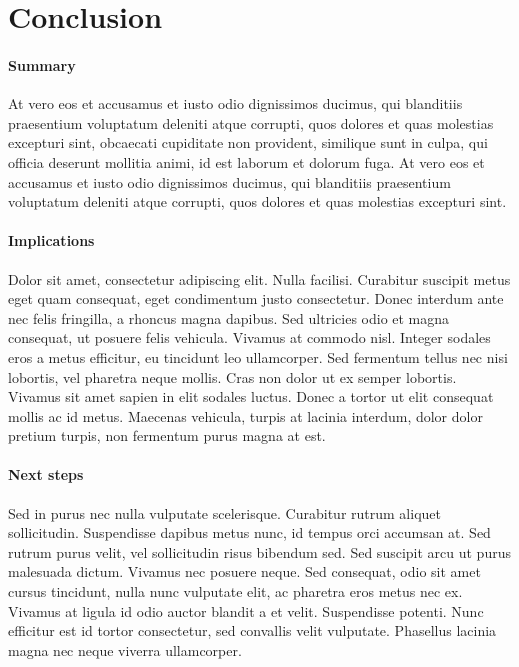 \documentclass[letterpaper,11pt,leqno]{article}
\begin{document}
\section{Conclusion}\label{s:ccl}

\paragraph{Summary}  At vero eos et accusamus et iusto odio dignissimos ducimus, qui blanditiis praesentium voluptatum deleniti atque corrupti, quos dolores et quas molestias excepturi sint, obcaecati cupiditate non provident, similique sunt in culpa, qui officia deserunt mollitia animi, id est laborum et dolorum fuga. At vero eos et accusamus et iusto odio dignissimos ducimus, qui blanditiis praesentium voluptatum deleniti atque corrupti, quos dolores et quas molestias excepturi sint.

\paragraph{Implications} Dolor sit amet, consectetur adipiscing elit. Nulla facilisi. Curabitur suscipit metus eget quam consequat, eget condimentum justo consectetur. Donec interdum ante nec felis fringilla, a rhoncus magna dapibus. Sed ultricies odio et magna consequat, ut posuere felis vehicula. Vivamus at commodo nisl. Integer sodales eros a metus efficitur, eu tincidunt leo ullamcorper. Sed fermentum tellus nec nisi lobortis, vel pharetra neque mollis. Cras non dolor ut ex semper lobortis. Vivamus sit amet sapien in elit sodales luctus. Donec a tortor ut elit consequat mollis ac id metus. Maecenas vehicula, turpis at lacinia interdum, dolor dolor pretium turpis, non fermentum purus magna at est. 

\paragraph{Next steps} Sed in purus nec nulla vulputate scelerisque. Curabitur rutrum aliquet sollicitudin. Suspendisse dapibus metus nunc, id tempus orci accumsan at. Sed rutrum purus velit, vel sollicitudin risus bibendum sed. Sed suscipit arcu ut purus malesuada dictum. Vivamus nec posuere neque. Sed consequat, odio sit amet cursus tincidunt, nulla nunc vulputate elit, ac pharetra eros metus nec ex. Vivamus at ligula id odio auctor blandit a et velit. Suspendisse potenti. Nunc efficitur est id tortor consectetur, sed convallis velit vulputate. Phasellus lacinia magna nec neque viverra ullamcorper.
\end{document}
